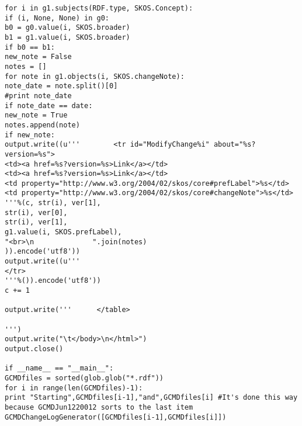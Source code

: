 \begin{verbatim}
for i in g1.subjects(RDF.type, SKOS.Concept):
if (i, None, None) in g0:
b0 = g0.value(i, SKOS.broader)
b1 = g1.value(i, SKOS.broader)
if b0 == b1:
new_note = False
notes = []
for note in g1.objects(i, SKOS.changeNote):
note_date = note.split()[0]
#print note_date
if note_date == date:
new_note = True
notes.append(note)
if new_note:
output.write((u'''        <tr id="ModifyChange%i" about="%s?version=%s">
<td><a href=%s?version=%s>Link</a></td>
<td><a href=%s?version=%s>Link</a></td>
<td property="http://www.w3.org/2004/02/skos/core#prefLabel">%s</td>
<td property="http://www.w3.org/2004/02/skos/core#changeNote">%s</td>
'''%(c, str(i), ver[1],
str(i), ver[0],
str(i), ver[1],
g1.value(i, SKOS.prefLabel),
"<br>\n              ".join(notes)
)).encode('utf8'))
output.write((u'''
</tr>
'''%()).encode('utf8'))
c += 1

output.write('''      </table>

''')
output.write("\t</body>\n</html>")
output.close()

if __name__ == "__main__":
GCMDfiles = sorted(glob.glob("*.rdf"))
for i in range(len(GCMDfiles)-1):
print "Starting",GCMDfiles[i-1],"and",GCMDfiles[i] #It's done this way because GCMDJun1220012 sorts to the last item
GCMDChangeLogGenerator([GCMDfiles[i-1],GCMDfiles[i]])
\end{verbatim}


